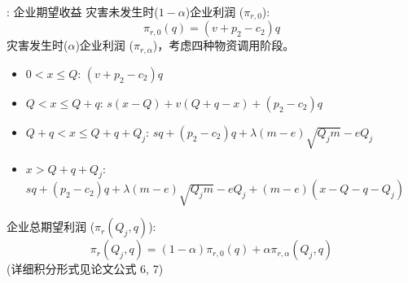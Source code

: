 \documentclass[9pt]{beamer}
\begin{document}
\begin{frame}{\insertsectionhead: 企业期望收益}
    灾害未发生时($1-\alpha$)企业利润 ($\pi_{r,0}$):
    \begin{equation} \label{eq:beamer_enterprise_profit_no_disaster}
    {\pi}_{r,0}(q) = (v + p_2 - c_2)q
    \end{equation}
    灾害发生时($\alpha$)企业利润 ($\pi_{r,\alpha}$)，考虑四种物资调用阶段。
    \begin{itemize}
        \item $0 < x \leq Q$: $(v + p_2 - c_2)q$
        \item $Q < x \leq Q+q$: $s(x-Q) + v(Q + q - x) + (p_2 - c_2)q$
        \item $Q+q < x \leq Q+q+Q_j$: $sq + (p_2 - c_2)q + \lambda(m-e)\sqrt{Q_jm} - eQ_j$
        \item $x > Q+q+Q_j$: $sq + (p_2 - c_2)q + \lambda(m-e)\sqrt{Q_jm} - eQ_j + (m-e)(x-Q-q-Q_j)$
    \end{itemize}
    企业总期望利润 (${\pi}_r(Q_j,q)$):
    \begin{equation} \label{eq:beamer_enterprise_expected_profit}
    {\pi}_r(Q_j,q) = (1-\alpha){\pi}_{r,0}(q) + \alpha{\pi}_{r,\alpha}(Q_j,q)
    \end{equation}
    (详细积分形式见论文公式 6, 7)
\end{frame}
\end{document}
